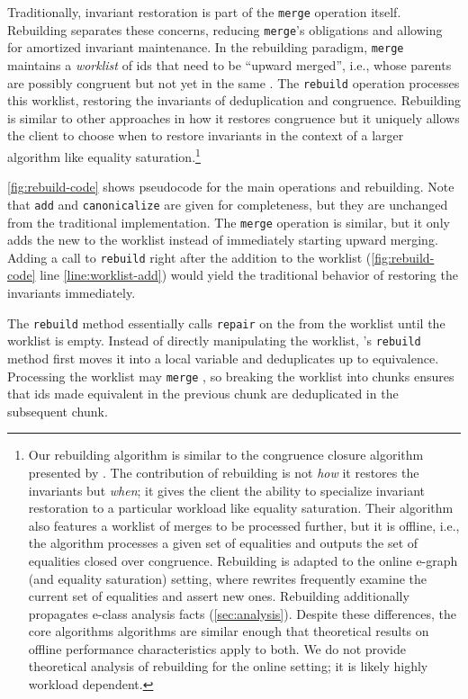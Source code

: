 Traditionally, invariant restoration is part of the
  \texttt{merge} operation itself.
Rebuilding separates these concerns,
  reducing \texttt{merge}'s obligations
  and allowing for amortized invariant maintenance.
In the rebuilding paradigm,
  \texttt{merge} maintains a \textit{worklist} of \eclass ids that need to
  be ``upward merged'', i.e., \eclasses whose parents are possibly congruent but
  not yet in the same \eclass.
The \texttt{rebuild} operation processes this worklist, restoring the invariants
  of deduplication and congruence.
Rebuilding is similar to other approaches in how it restores congruence
  but it uniquely allows the client to choose when to restore invariants in the
  context of a larger algorithm like equality saturation.\footnote{
Our rebuilding algorithm is similar to the congruence closure algorithm
  presented by \cite{downey-cse}.
The contribution of rebuilding is not \emph{how} it restores the \egraph invariants
  but \emph{when};
  it gives the client the ability to specialize invariant restoration to a
  particular workload like equality saturation.
Their algorithm also features a worklist of merges to be processed further,
  but it is offline, i.e.,
  the algorithm processes a given set of equalities and outputs the set of
  equalities closed over congruence.
Rebuilding is adapted to the online e-graph (and equality saturation) setting,
  where rewrites frequently examine the current set of equalities and assert new ones.
Rebuilding additionally propagates e-class analysis facts (\autoref{sec:analysis}).
Despite these differences,
  the core algorithms algorithms are similar enough that theoretical results on
  offline performance characteristics \cite{downey-cse} apply to both.
We do not provide theoretical analysis of rebuilding for the online setting;
  it is likely highly workload dependent.
}

\autoref{fig:rebuild-code} shows pseudocode for the main \egraph operations and
  rebuilding.
Note that \texttt{add} and \texttt{canonicalize} are given for completeness, but
  they are unchanged from the traditional \egraph implementation.
The \texttt{merge} operation is similar, but it only adds the new \eclass to the
  worklist instead of immediately starting upward merging.
Adding a call to \texttt{rebuild} right after the addition to
  the worklist (\autoref{fig:rebuild-code} line \ref{line:worklist-add})
  would yield the traditional behavior of restoring the invariants immediately.

The \texttt{rebuild} method essentially calls \texttt{repair} on the \eclasses
  from the worklist until the worklist is empty.
Instead of directly manipulating the worklist, \egg's \texttt{rebuild} method
  first moves it into a local variable and deduplicates \eclasses
  up to equivalence.
Processing the worklist may \texttt{merge} \eclasses,
  so breaking the worklist into chunks ensures that \eclass ids made
  equivalent in the previous chunk are deduplicated in the subsequent chunk.

